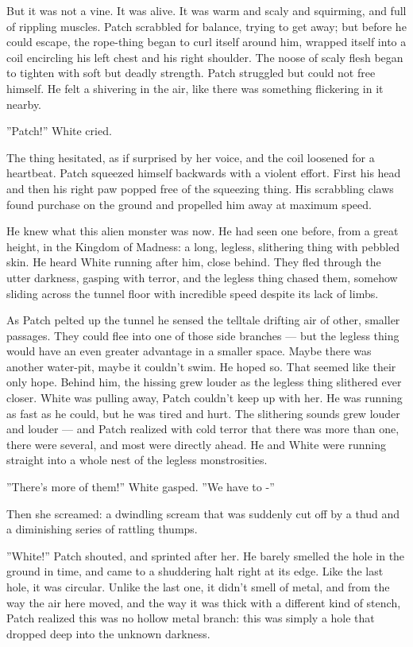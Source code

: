 \documentclass[12pt]{book}
\begin{document}
But it was not a vine. It was alive. It was warm and scaly and squirming, and full of rippling muscles. Patch scrabbled for balance, trying to get away; but before he could escape, the rope-thing began to curl itself around him, wrapped itself into a coil encircling his left chest and his right shoulder. The noose of scaly flesh began to tighten with soft but deadly strength. Patch struggled but could not free himself. He felt a shivering in the air, like there was something flickering in it nearby.

''Patch!'' White cried.

The thing hesitated, as if surprised by her voice, and the coil loosened for a heartbeat. Patch squeezed himself backwards with a violent effort. First his head and then his right paw popped free of the squeezing thing. His scrabbling claws found purchase on the ground and propelled him away at maximum speed.

He knew what this alien monster was now. He had seen one before, from a great height, in the Kingdom of Madness: a long, legless, slithering thing with pebbled skin. He heard White running after him, close behind. They fled through the utter darkness, gasping with terror, and the legless thing chased them, somehow sliding across the tunnel floor with incredible speed despite its lack of limbs.

As Patch pelted up the tunnel he sensed the telltale drifting air of other, smaller passages. They could flee into one of those side branches ---
but the legless thing would have an even greater advantage in a smaller space. Maybe there was another water-pit, maybe it couldn't swim. He hoped so. That seemed like their only hope. Behind him, the hissing grew louder as the legless thing slithered ever closer. White was pulling away, Patch couldn't keep up with her. He was running as fast as he could, but he was tired and hurt. The slithering sounds grew louder and louder ---
and Patch realized with cold terror that there was more than one, there were several, and most were directly ahead. He and White were running straight into a whole nest of the legless monstrosities.

''There's more of them!'' White gasped. ''We have to -''

Then she screamed: a dwindling scream that was suddenly cut off by a thud and a diminishing series of rattling thumps.

''White!'' Patch shouted, and sprinted after her. He barely smelled the hole in the ground in time, and came to a shuddering halt right at its edge. Like the last hole, it was circular. Unlike the last one, it didn't smell of metal, and from the way the air here moved, and the way it was thick with a different kind of stench, Patch realized this was no hollow metal branch: this was simply a hole that dropped deep into the unknown darkness.
\end{document}
